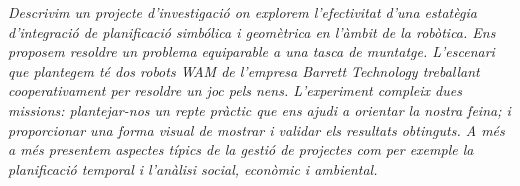 \documentclass[11pt,a4paper,oldfontcommands,oneside]{memoir}
\begin{document}
\vspace{1cm}
\noindent
{\itshape
	Descrivim un projecte d'investigaci\'o on explorem l'efectivitat d'una
	estat\`egia d'integraci\'o de planificaci\'o simb\'olica i geom\`etrica
	en l'àmbit de la rob\`otica. Ens proposem resoldre un problema equiparable
	a una tasca de muntatge. L'escenari que
	plantegem t\'e dos robots WAM de l'empresa Barrett Technology
	treballant cooperativament per resoldre un joc pels nens. L'experiment
	compleix dues missions: plantejar-nos un repte pr\`actic que ens ajudi a
	orientar la nostra feina; i proporcionar una forma visual de mostrar i
	validar els resultats obtinguts. A m\'es a m\'es presentem aspectes
	t\'ipics de la gesti\'o de projectes com per exemple la planificaci\'o
	temporal i l'an\`alisi social, econ\`omic i ambiental.
}
\cleardoublepage




\tableofcontents

\cleardoublepage


%





\printbibliography
\end{document}
